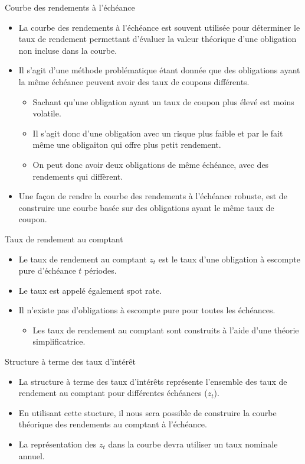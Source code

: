 \documentclass[11pt]{beamer}
\begin{document}
\begin{frame}{Courbe des rendements à l’échéance}
\begin{itemize}
\item La courbe des rendements à l'échéance est souvent utilisée pour déterminer le taux de rendement permettant d’évaluer la valeur théorique d’une obligation non incluse dans la courbe. 
\item Il s'agit d'une méthode problématique étant donnée que des obligations ayant la même échéance peuvent avoir des taux de coupons différents.
\begin{itemize}
\item Sachant qu'une obligation ayant un taux de coupon plus élevé est moins volatile. 
\item Il s'agit donc d'une obligation avec un risque plus faible et par le fait même une obligaiton qui offre plus petit rendement.  
\item On peut donc avoir deux obligations de même échéance,  avec des rendements qui diffèrent.
\end{itemize}
\item Une  façon de rendre la courbe des rendements à l'échéance robuste,  est de construire une courbe basée sur des obligations ayant le même taux de coupon.
\end{itemize}
\end{frame}
\begin{frame}{Taux de rendement au comptant}
\begin{itemize}
\item Le taux de rendement au comptant $z_t$ est le taux d’une obligation à escompte pure d’échéance $t$ périodes. 
\item Le taux est appelé également spot rate.  
\item Il n’existe pas d’obligations à escompte pure pour toutes les échéances. 
\begin{itemize}
\item  Les taux de rendement au comptant sont construits à l’aide d’une théorie simplificatrice.\end{itemize} 
\end{itemize}
\end{frame}
\begin{frame}{Structure à terme des taux d’intérêt}
\begin{itemize}
\item La structure à terme des taux d'intérêts représente l'ensemble des taux de rendement au comptant pour différentes échéances ($z_t$). 
\item En utilisant cette stucture,  il nous sera possible de construire la courbe théorique des rendements au comptant à l’échéance. 
\item La représentation des $z_t$ dans la courbe devra utiliser un taux nominale annuel.
\end{itemize}
\end{frame}
\end{document}
